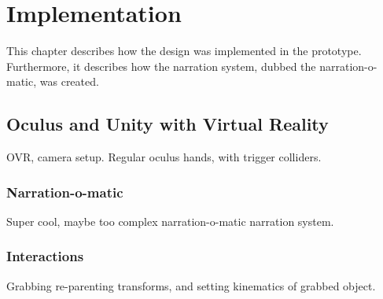 \chapter{Implementation}
This chapter describes how the design was implemented in the prototype. Furthermore, it describes how the narration system, dubbed the narration-o-matic, was created.

\section{Oculus and Unity with Virtual Reality}
    OVR, camera setup. Regular oculus hands, with trigger colliders.
\subsection{Narration-o-matic}
    Super cool, maybe too complex narration-o-matic narration system.
\subsection{Interactions}
    Grabbing re-parenting transforms, and setting kinematics of grabbed object.